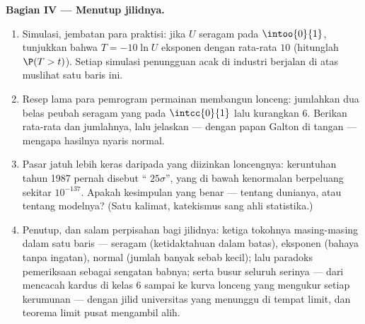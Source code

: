 \begin{problem}
\medskip
\noindent\textbf{Bagian IV --- Menutup jilidnya.}
\begin{enumerate}[resume]
  \item Simulasi, jembatan para praktisi: jika $U$
        seragam pada $\intoo{0}{1}$, tunjukkan bahwa
        $T = -10\ln U$ eksponen dengan rata-rata $10$ (hitunglah
        $\P(T > t)$). Setiap simulasi penungguan acak di
        industri berjalan di atas muslihat satu baris ini.
  \item Resep lama para pemrogram permainan membangun lonceng: jumlahkan
        dua belas peubah seragam yang  pada $\intcc{0}{1}$ lalu
        kurangkan $6$. Berikan rata-rata dan  jumlahnya,
        lalu jelaskan --- dengan papan Galton di tangan --- mengapa
        hasilnya nyaris normal.
  \item Pasar jatuh lebih keras daripada yang diizinkan loncengnya: keruntuhan tahun
        1987 pernah disebut `` $25\sigma$'', yang
        di bawah kenormalan berpeluang sekitar $10^{-137}$.
        Apakah kesimpulan yang benar --- tentang dunianya, atau
        tentang modelnya? (Satu kalimat, katekismus sang ahli statistika.)
  \item Penutup, dan salam perpisahan bagi jilidnya: ketiga
        tokohnya masing-masing dalam satu baris --- seragam (ketidaktahuan
        dalam batas), eksponen (bahaya tanpa ingatan),
        normal (jumlah banyak sebab kecil); lalu paradoks pemeriksaan
        sebagai sengatan babnya; serta busur
        seluruh serinya --- dari mencacah kardus di kelas 6 sampai
        ke kurva lonceng yang mengukur setiap kerumunan --- dengan
        jilid universitas yang menunggu di tempat limit,
         dan teorema limit pusat mengambil alih.

\end{enumerate}
\end{problem}
